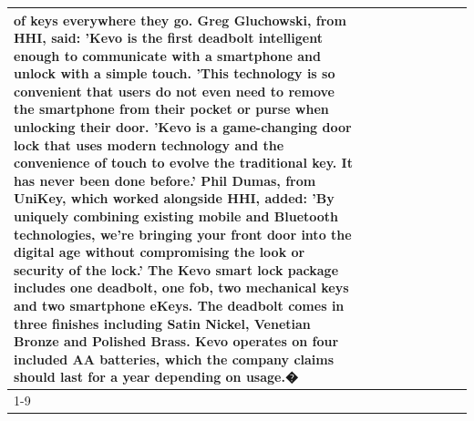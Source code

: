 \begin{table}[H]
\begin{tabular}{lllrlllll}
of keys everywhere they go. Greg Gluchowski, from HHI, said: 'Kevo is the first deadbolt intelligent enough to communicate with a smartphone and unlock with a simple touch. 'This technology is so convenient that users do not even need to remove the smartphone from their pocket or purse when unlocking their door. 'Kevo is a game-changing door lock that uses modern technology and the convenience of touch to evolve the traditional key. It has never been done before.' Phil Dumas, from UniKey, which worked alongside HHI, added: 'By uniquely combining existing mobile and Bluetooth technologies, we’re bringing your front door into the digital age without compromising the look or security of the lock.' The Kevo smart lock package includes one deadbolt, one fob, two mechanical keys and two smartphone eKeys. The deadbolt comes in three finishes including Satin Nickel, Venetian Bronze and Polished Brass. Kevo operates on four included AA batteries, which the company claims should last for a year depending on usage.� \\
\cline{1-9}

\end{tabular}
\end{table}
